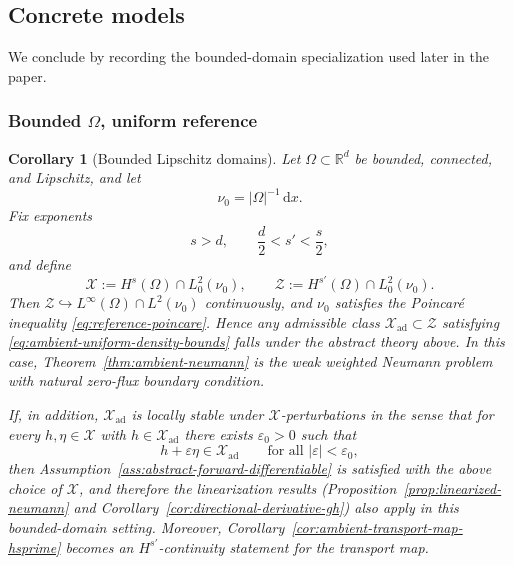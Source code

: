 \documentclass{article}
\newtheorem{corollary}[theorem]{Corollary}
\theoremstyle{definition}
\renewcommand{\d}{\mathrm{d}}
\begin{document}
\subsection{Concrete models}
\label{sec:infinite-dimensional-models}

We conclude by recording the bounded-domain specialization used later in the paper.

\subsubsection{Bounded \texorpdfstring{$\Omega$}{Omega}, uniform reference}

\begin{corollary}[Bounded Lipschitz domains]
    \label{cor:abstract-forward-bounded}
    Let \(\Omega\subset\mathbb R^d\) be bounded, connected, and Lipschitz, and let
    \[
        \nu_0=|\Omega|^{-1}\,\d x.
    \]
    Fix exponents
    \[
        s>d,
        \qquad
        \frac d2<s'<\frac s2,
    \]
    and define
    \[
        \mathcal X:=H^s(\Omega)\cap L^2_0(\nu_0),
        \qquad
        \mathcal Z:=H^{s'}(\Omega)\cap L^2_0(\nu_0).
    \]
    Then \(\mathcal Z\hookrightarrow L^\infty(\Omega)\cap L^2(\nu_0)\) continuously, and
    \(\nu_0\) satisfies the Poincar\'e inequality \eqref{eq:reference-poincare}. Hence any
    admissible class \(\mathcal X_{\mathrm{ad}}\subset\mathcal Z\) satisfying
    \eqref{eq:ambient-uniform-density-bounds} falls under the abstract theory above. In this
    case, Theorem~\ref{thm:ambient-neumann} is the weak weighted Neumann problem with
    natural zero-flux boundary condition.

    If, in addition, \(\mathcal X_{\mathrm{ad}}\) is locally stable under \(\mathcal X\)-perturbations in the
    sense that for every \(h,\eta\in\mathcal X\) with \(h\in\mathcal X_{\mathrm{ad}}\) there exists
    \(\varepsilon_0>0\) such that
    \[
        h+\varepsilon\eta\in\mathcal X_{\mathrm{ad}}
        \qquad
        \text{for all }|\varepsilon|<\varepsilon_0,
    \]
    then Assumption~\ref{ass:abstract-forward-differentiable} is satisfied with the above choice of
    \(\mathcal X\), and therefore the linearization results
    (Proposition~\ref{prop:linearized-neumann} and
    Corollary~\ref{cor:directional-derivative-gh}) also apply in this bounded-domain setting.
    Moreover, Corollary~\ref{cor:ambient-transport-map-hsprime} becomes an \(H^{s'}\)-continuity
    statement for the transport map.
\end{corollary}
\end{document}
